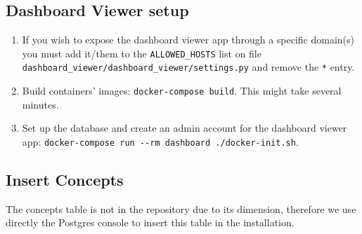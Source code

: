 \documentclass[
]{book}
\begin{document}
\hypertarget{dashboard-viewer-setup}{%
\subsection*{Dashboard Viewer setup}\label{dashboard-viewer-setup}}

\begin{enumerate}
\def\labelenumi{\arabic{enumi}.}
\item
  If you wish to expose the dashboard viewer app through a specific domain(s) you must add it/them to the \texttt{ALLOWED\_HOSTS} list on file \texttt{dashboard\_viewer/dashboard\_viewer/settings.py} and remove the \texttt{\textquotesingle{}*\textquotesingle{}} entry.
\item
  Build containers' images: \texttt{docker-compose\ build}. This might take several minutes.
\item
  Set up the database and create an admin account for the dashboard viewer app: \texttt{docker-compose\ run\ -\/-rm\ dashboard\ ./docker-init.sh}.
\end{enumerate}

\hypertarget{insert-concepts}{%
\subsection*{Insert Concepts}\label{insert-concepts}}

The concepts table is not in the repository due to its dimension, therefore we use directly the Postgres console to insert this table in the installation.
\end{document}
